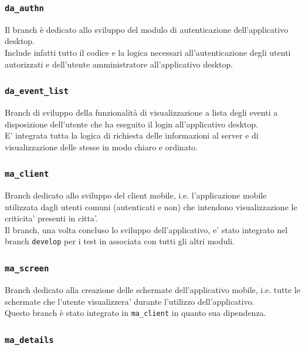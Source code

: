 \documentclass{article}
\begin{document}
\subsubsection{\texttt{da\_authn}}

Il branch è dedicato allo sviluppo del modulo di autenticazione dell'applicativo desktop.\\
Include infatti tutto il codice e la logica necessari all'autenticazione degli utenti autorizzati e dell'utente amministratore all'applicativo desktop.

\subsubsection{\texttt{da\_event\_list}}

Branch di sviluppo della funzionalità di visualizzazione a lista degli eventi a disposizione dell'utente che ha eseguito il login all'applicativo desktop.\\
E' integrata tutta la logica di richiesta delle informazioni al server e di visualizzazione delle stesse in modo chiaro e ordinato.

\subsubsection{\texttt{ma\_client}}

Branch dedicato allo sviluppo del client mobile, i.e. l'applicazione mobile utilizzata dagli utenti comuni (autenticati e non) che intendono visualizzazione le criticita' presenti in citta'.\\
Il branch, una volta concluso lo sviluppo dell'applicativo, e' stato integrato nel branch \texttt{develop} per i test in associata con tutti gli altri moduli.


\subsubsection{\texttt{ma\_screen}}

Branch dedicato alla creazione delle schermate dell'applicativo mobile, i.e. tutte le schermate che l'utente visualizzera' durante l'utilizzo dell'applicativo.\\
Questo branch è stato integrato in \texttt{ma\_client} in quanto sua dipendenza.

\subsubsection{\texttt{ma\_details}}
\end{document}
